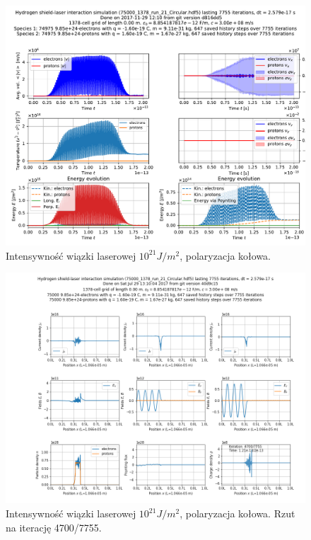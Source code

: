 \begin{figure}[h!]
  \includegraphics[width=\textwidth]{Images/75000_1378_run_21_Circular}
  \caption{Intensywność wiązki laserowej $10^{21} J/m^2$, polaryzacja kołowa.\label{fig:laser-21-Circular}}
\end{figure}

\begin{figure}[h!]
  \includegraphics[width=\textwidth]{Images/75000_1378_run_21_Circular_004700}
  \caption{Intensywność wiązki laserowej $10^{21} J/m^2$, polaryzacja kołowa. Rzut na iterację 4700/7755.\label{fig:laser-21-Circular-snapshot}}
\end{figure}

